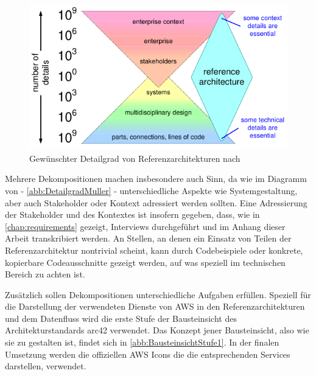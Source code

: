 \begin{figure}[H]
\centering
\includegraphics[height=0.23\textheight]{graphics/reference-architecture-details.pdf}
\caption[Gewünschter Detailgrad von Referenzarchitekturen nach \citeauthor{Muller.2020}]{Gewünschter Detailgrad von Referenzarchitekturen nach \citeauthor{Muller.2020}\footnotemark}
\label{abb:DetailgradMuller}
\end{figure}

Mehrere Dekompositionen machen insbesondere auch Sinn, da wie im Diagramm von \citeauthor{Muller.2020} - \autoref{abb:DetailgradMuller} - unterschiedliche Aspekte wie Systemgestaltung, aber auch Stakeholder oder Kontext adressiert werden sollten. Eine Adressierung der Stakeholder und des Kontextes ist insofern gegeben, dass, wie in \autoref{chap:requirements} gezeigt, Interviews durchgeführt und im Anhang dieser Arbeit transkribiert werden. An Stellen, an denen ein Einsatz von Teilen der Referenzarchitektur nontrivial scheint, kann durch Codebeispiele oder konkrete, kopierbare Codeausschnitte gezeigt werden, auf was speziell im technischen Bereich zu achten ist.

Zusätzlich sollen Dekompositionen unterschiedliche Aufgaben erfüllen. Speziell für die Darstellung der verwendeten Dienste von \ac{AWS} in den Referenzarchitekturen und dem Datenfluss wird die erste Stufe der Bausteinsicht des Architekturstandards arc42 verwendet. Das Konzept jener Bausteinsicht, also wie sie zu gestalten ist, findet sich in \autoref{abb:BausteinsichtStufe1}. In der finalen Umsetzung werden die offiziellen \ac{AWS} Icons die die entsprechenden Services darstellen, verwendet.


